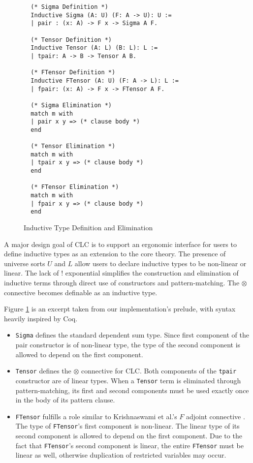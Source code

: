 \documentclass[sigplan,screen]{acmart}
\theoremstyle{definition}
\begin{document}
  \begin{figure}[h]
  \vspace{-1em}
  \caption{Inductive Type Definition and Elimination}
  \begin{lstlisting}
  (* Sigma Definition *)
  Inductive Sigma (A: U) (F: A -> U): U :=
  | pair : (x: A) -> F x -> Sigma A F.

  (* Tensor Definition *)
  Inductive Tensor (A: L) (B: L): L :=
  | tpair: A -> B -> Tensor A B.

  (* FTensor Definition *)
  Inductive FTensor (A: U) (F: A -> L): L :=
  | fpair: (x: A) -> F x -> FTensor A F.

  (* Sigma Elimination *)
  match m with
  | pair x y => (* clause body *)
  end

  (* Tensor Elimination *)
  match m with
  | tpair x y => (* clause body *)
  end

  (* FTensor Elimination *)
  match m with
  | fpair x y => (* clause body *)
  end
  \end{lstlisting}
  \vspace{-1em}
  \label{inductive}
  \Description{}
  \end{figure}

  A major design goal of CLC is to support an ergonomic interface for users to define inductive types \cite{inductive,cic} as an extension to the core theory. The presence of universe sorts $U$ and $L$ allow users to declare inductive types to be non-linear or linear. The lack of ! exponential simplifies the construction and elimination of inductive terms through direct use of constructors and pattern-matching. The $\otimes$ connective becomes definable as an inductive type.
  
  Figure \ref{inductive} is an excerpt taken from our implementation's prelude, with syntax heavily inspired by Coq.

  \begin{itemize}
    \item \texttt{Sigma} defines the standard dependent sum type. Since first component of the pair constructor is of non-linear type, the type of the second component is allowed to depend on the first component.
    \item \texttt{Tensor} defines the $\otimes$ connective for CLC. Both components of the \texttt{tpair} constructor are of linear types. When a \texttt{Tensor} term is eliminated through pattern-matching, its first and second components must be used exactly once in the body of its pattern clause.
    \item \texttt{FTensor} fulfills a role similar to Krishnaswami et al.'s $F$ adjoint connective \cite{neel15}. The type of \texttt{FTensor}'s first component is non-linear. The linear type of its second component is allowed to depend on the first component. Due to the fact that \texttt{FTensor}'s second component is linear, the entire \texttt{FTensor} must be linear as well, otherwise duplication of restricted variables may occur.
  \end{itemize}
  
\end{document}
